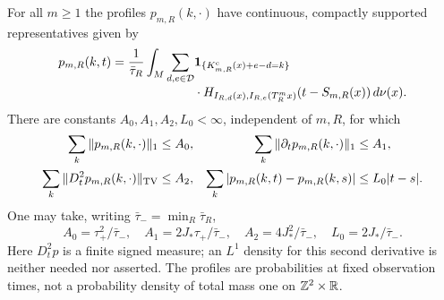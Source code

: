 \begin{theorem}
\label{thm:stationary-overlap-regularity}
For all $m\ge1$ the profiles $p_{m,R}(k,\cdot)$ have continuous,
compactly supported representatives given by
\begin{align}
 p_{m,R}(k,t)
 =\frac1{\bar\tau_R}\int_M\sum_{d,e\in\mathcal D}
 &\one_{\{K^{\rm c}_{m,R}(x)+e-d=k\}}\notag\\[-1mm]
 &\cdot H_{I_{R,d}(x),I_{R,e}(T_R^mx)}(t-S_{m,R}(x))\,d\nu(x).
 \label{eq:exact-overlap-probability}
\end{align}
There are constants $A_0,A_1,A_2,L_0<\infty$, independent of $m,R$,
for which
\begin{align}
 \sum_k\|p_{m,R}(k,\cdot)\|_1&\le A_0,&
 \sum_k\|\partial_t p_{m,R}(k,\cdot)\|_1&\le A_1,
                                      \label{eq:stationary-time-W1}\\
 \sum_k\|D_t^2p_{m,R}(k,\cdot)\|_{\TV}&\le A_2,&
 \sum_k|p_{m,R}(k,t)-p_{m,R}(k,s)|&\le L_0|t-s|.
                                      \label{eq:stationary-time-curvature}
\end{align}
One may take, writing $\bar\tau_- =\min_R\bar\tau_R$,
\[
 A_0=\tau_+^2/\bar\tau_-,\quad
 A_1=2J_*\tau_+/\bar\tau_-,\quad
 A_2=4J_*^2/\bar\tau_-,\quad L_0=2J_*/\bar\tau_-.
\]
Here $D_t^2p$ is a finite signed measure; an $L^1$ density for this
second derivative is neither needed nor asserted. The profiles are
probabilities at fixed observation times, not a probability density
of total mass one on $\mathbb Z^2\times\mathbb R$.
\end{theorem}
